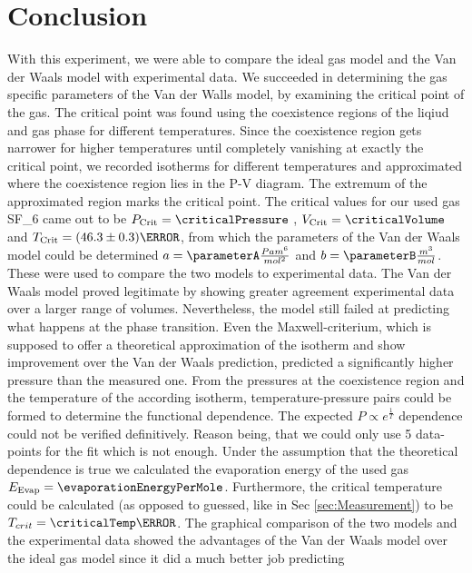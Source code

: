 \documentclass[a4paper,10pt,twocolumn]{article}
\begin{document}
    
    \section[]{Conclusion}\label{sec:conclusion}
    With this experiment, we were able to compare the ideal gas model and the Van der Waals model with experimental data.
    We succeeded in determining the gas specific parameters of the Van der Walls model, by examining the critical point of the gas.
    The critical point was found using the coexistence regions of the liqiud and gas phase for different temperatures. 
    Since the coexistence region gets narrower for higher temperatures until completely vanishing at exactly the critical point, we recorded isotherms for different temperatures
    and approximated where the coexistence region lies in the P-V diagram.
    The extremum of the approximated region marks the critical point.
    The critical values for our used gas SF_6\) came out to be $P_{\text{Crit}}=\criticalPressure$ , $V_{\text{Crit}}=\criticalVolume$ and $T_{\text{Crit}}=(46.3\pm 0.3)\degree$, from which the parameters of the Van der Waals model could be determined
    $a=\parameterA \frac{Pa m^6}{mol^2} $ and $b=\parameterB \frac{m^3}{mol} $.
    These were used to compare the two models to experimental data.
    The Van der Waals model proved legitimate by showing greater agreement experimental data over a larger range of volumes.
    Nevertheless, the model still failed at predicting what happens at the phase transition.
    Even the Maxwell-criterium, which is supposed to offer a theoretical approximation of the isotherm and show improvement over the Van der Waals prediction,
    predicted a significantly higher pressure than the measured one.
    From the pressures at the coexistence region and the temperature of the according isotherm, temperature-pressure pairs could be formed to determine the functional dependence.
    The expected $P \propto e^{\frac{1}{T}} $ dependence could not be verified definitively.
    Reason being, that we could only use 5 data-points for the fit which is not enough.
    Under the assumption that the theoretical dependence is true we calculated the evaporation energy of the used gas $E_{\text{Evap}} =\evaporationEnergyPerMole $.
    Furthermore, the critical temperature could be calculated (as opposed to guessed, like in Sec \ref{sec:Measurement}) to be $T_{crit}=\criticalTemp \degree$.
    The graphical comparison of the two models and the experimental data showed the advantages of the Van der Waals model over the ideal gas model since it did a much better job predicting
\end{document}
